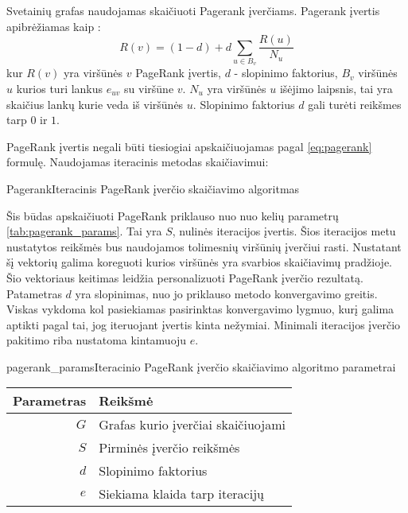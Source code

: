 Svetainių grafas naudojamas skaičiuoti Pagerank įverčiams. Pagerank įvertis apibrėžiamas kaip \cite{pagerank}:
\begin{equation} \label{eq:pagerank}
    R(v) = (1 - d) + d \sum_{u \in B_{v}} \frac{R(u)}{N_u}
\end{equation}
kur $R(v)$ yra viršūnės $v$ PageRank įvertis, $d$ - slopinimo faktorius, $B_v$ viršūnės $u$ kurios turi lankus $e_{uv}$ su viršūne $v$. $N_u$ yra viršūnės $u$ išėjimo laipsnis, tai yra skaičius lankų kurie veda iš viršūnės $u$. Slopinimo faktorius $d$ gali turėti reikšmes tarp $0$ ir $1$.

PageRank įvertis negali būti tiesiogiai apskaičiuojamas pagal \ref{eq:pagerank} formulę. Naudojamas iteracinis metodas  skaičiavimui:

\begin{ktualgo}{Pagerank}{Iteracinis PageRank įverčio skaičiavimo algoritmas}
\Repeat
{}
\EndFor{}
\EndFor{}
\end{ktualgo}

Šis būdas apskaičiuoti PageRank priklauso nuo nuo kelių parametrų \vref{tab:pagerank_params}. Tai yra $S$, nulinės iteracijos įvertis. Šios iteracijos metu nustatytos reikšmės bus naudojamos tolimesnių viršūnių įverčiui rasti. Nustatant šį vektorių galima koreguoti kurios viršūnės yra svarbios skaičiavimų pradžioje. Šio vektoriaus keitimas leidžia personalizuoti PageRank įverčio rezultatą. Patametras $d$ yra slopinimas, nuo jo priklauso metodo konvergavimo greitis. Viskas vykdoma kol pasiekiamas pasirinktas konvergavimo lygmuo, kurį galima aptikti pagal tai, jog iteruojant įvertis kinta nežymiai. Minimali iteracijos įverčio pakitimo riba nustatoma kintamuoju $e$.

\begin{ktutable}{pagerank_params}{Iteracinio PageRank įverčio skaičiavimo algoritmo parametrai}
    \begin{tabular}{ | r | l | }
        \hline
        Parametras & Reikšmė \\ \hline
        $G$ & Grafas kurio įverčiai skaičiuojami \\ \hline
        $S$ & Pirminės įverčio reikšmės \\ \hline
        $d$ & Slopinimo faktorius \\ \hline
        $e$ & Siekiama klaida tarp iteracijų \\ \hline
    \end{tabular}
\end{ktutable}

